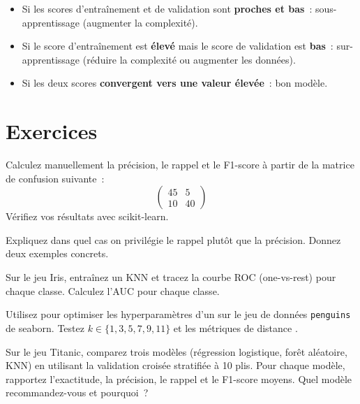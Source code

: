 \begin{intuition}
\begin{itemize}
    \item Si les scores d'entra\^inement et de validation sont \textbf{proches et bas}~: sous-apprentissage (augmenter la complexit\'e).
    \item Si le score d'entra\^inement est \textbf{\'elev\'e} mais le score de validation est \textbf{bas}~: sur-apprentissage (r\'eduire la complexit\'e ou augmenter les donn\'ees).
    \item Si les deux scores \textbf{convergent vers une valeur \'elev\'ee}~: bon mod\`ele.
\end{itemize}
\end{intuition}

\section{Exercices}

\begin{exercice}[$\star$]
Calculez manuellement la pr\'ecision, le rappel et le F1-score \`a partir de la matrice de confusion suivante~:
\[
\begin{pmatrix} 45 & 5 \\ 10 & 40 \end{pmatrix}
\]
V\'erifiez vos r\'esultats avec scikit-learn.
\end{exercice}

\begin{exercice}[$\star$]
Expliquez dans quel cas on privil\'egie le rappel plut\^ot que la pr\'ecision. Donnez deux exemples concrets.
\end{exercice}

\begin{exercice}[$\star\star$]
Sur le jeu Iris, entra\^inez un KNN et tracez la courbe ROC (one-vs-rest) pour chaque classe. Calculez l'AUC pour chaque classe.
\end{exercice}

\begin{exercice}[$\star\star$]
Utilisez  pour optimiser les hyperparam\`etres d'un  sur le jeu de donn\'ees \texttt{penguins} de seaborn. Testez $k \in \{1, 3, 5, 7, 9, 11\}$ et les m\'etriques de distance .
\end{exercice}

\begin{exercice}[$\star\star\star$]
Sur le jeu Titanic, comparez trois mod\`eles (r\'egression logistique, for\^et al\'eatoire, KNN) en utilisant la validation crois\'ee stratifi\'ee \`a 10 plis. Pour chaque mod\`ele, rapportez l'exactitude, la pr\'ecision, le rappel et le F1-score moyens. Quel mod\`ele recommandez-vous et pourquoi~?
\end{exercice}

